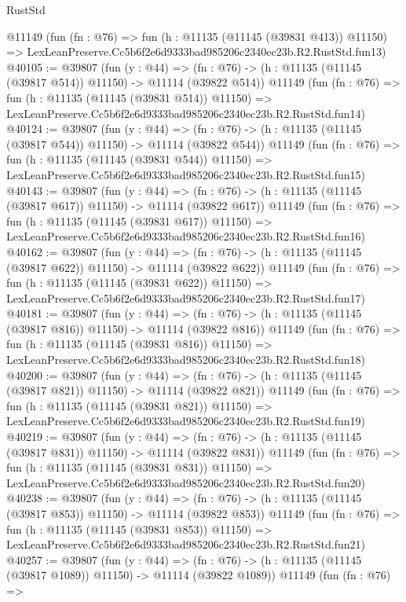 \begin{lexlean}{RustStd}
\begin{coremodule}
    @11149
    (fun (fn : @76) =>
    fun (h : @11135 (@11145 (@39831 @413)) @11150) =>
    LexLeanPreserve.Cc5b6f2e6d9333bad985206c2340ec23b.R2.RustStd.fun13)
@40105 := @39807
    (fun (y : @44) =>
    (fn : @76) -> (h : @11135 (@11145 (@39817 @514)) @11150) -> @11114 (@39822 @514))
    @11149
    (fun (fn : @76) =>
    fun (h : @11135 (@11145 (@39831 @514)) @11150) =>
    LexLeanPreserve.Cc5b6f2e6d9333bad985206c2340ec23b.R2.RustStd.fun14)
@40124 := @39807
    (fun (y : @44) =>
    (fn : @76) -> (h : @11135 (@11145 (@39817 @544)) @11150) -> @11114 (@39822 @544))
    @11149
    (fun (fn : @76) =>
    fun (h : @11135 (@11145 (@39831 @544)) @11150) =>
    LexLeanPreserve.Cc5b6f2e6d9333bad985206c2340ec23b.R2.RustStd.fun15)
@40143 := @39807
    (fun (y : @44) =>
    (fn : @76) -> (h : @11135 (@11145 (@39817 @617)) @11150) -> @11114 (@39822 @617))
    @11149
    (fun (fn : @76) =>
    fun (h : @11135 (@11145 (@39831 @617)) @11150) =>
    LexLeanPreserve.Cc5b6f2e6d9333bad985206c2340ec23b.R2.RustStd.fun16)
@40162 := @39807
    (fun (y : @44) =>
    (fn : @76) -> (h : @11135 (@11145 (@39817 @622)) @11150) -> @11114 (@39822 @622))
    @11149
    (fun (fn : @76) =>
    fun (h : @11135 (@11145 (@39831 @622)) @11150) =>
    LexLeanPreserve.Cc5b6f2e6d9333bad985206c2340ec23b.R2.RustStd.fun17)
@40181 := @39807
    (fun (y : @44) =>
    (fn : @76) -> (h : @11135 (@11145 (@39817 @816)) @11150) -> @11114 (@39822 @816))
    @11149
    (fun (fn : @76) =>
    fun (h : @11135 (@11145 (@39831 @816)) @11150) =>
    LexLeanPreserve.Cc5b6f2e6d9333bad985206c2340ec23b.R2.RustStd.fun18)
@40200 := @39807
    (fun (y : @44) =>
    (fn : @76) -> (h : @11135 (@11145 (@39817 @821)) @11150) -> @11114 (@39822 @821))
    @11149
    (fun (fn : @76) =>
    fun (h : @11135 (@11145 (@39831 @821)) @11150) =>
    LexLeanPreserve.Cc5b6f2e6d9333bad985206c2340ec23b.R2.RustStd.fun19)
@40219 := @39807
    (fun (y : @44) =>
    (fn : @76) -> (h : @11135 (@11145 (@39817 @831)) @11150) -> @11114 (@39822 @831))
    @11149
    (fun (fn : @76) =>
    fun (h : @11135 (@11145 (@39831 @831)) @11150) =>
    LexLeanPreserve.Cc5b6f2e6d9333bad985206c2340ec23b.R2.RustStd.fun20)
@40238 := @39807
    (fun (y : @44) =>
    (fn : @76) -> (h : @11135 (@11145 (@39817 @853)) @11150) -> @11114 (@39822 @853))
    @11149
    (fun (fn : @76) =>
    fun (h : @11135 (@11145 (@39831 @853)) @11150) =>
    LexLeanPreserve.Cc5b6f2e6d9333bad985206c2340ec23b.R2.RustStd.fun21)
@40257 := @39807
    (fun (y : @44) =>
    (fn : @76) -> (h : @11135 (@11145 (@39817 @1089)) @11150) -> @11114 (@39822 @1089))
    @11149
    (fun (fn : @76) =>

\end{coremodule}
\end{lexlean}
